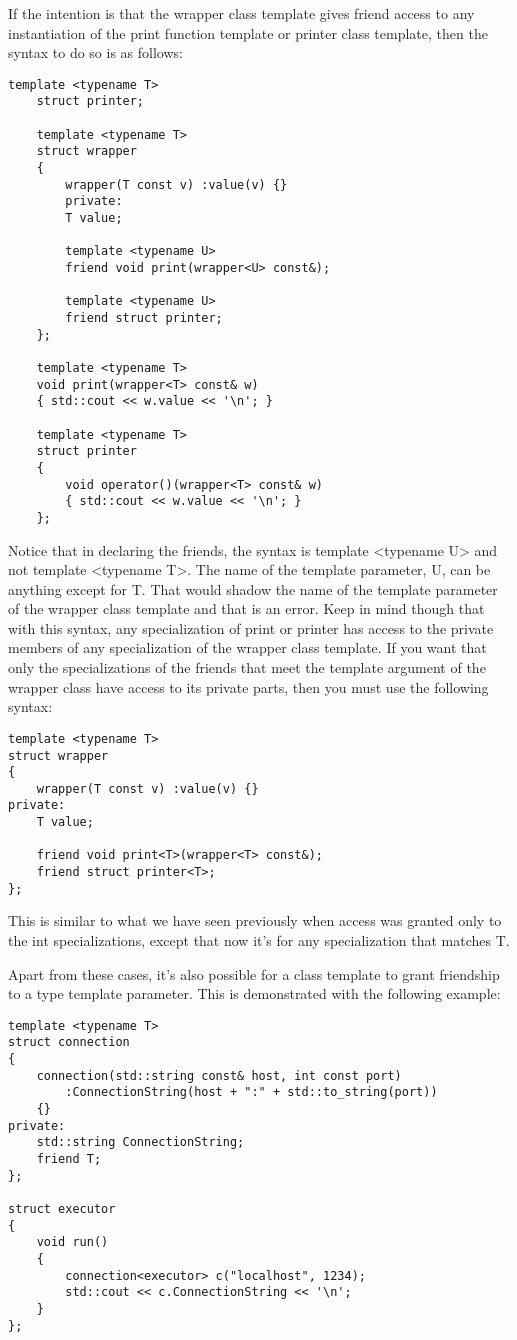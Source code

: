 If the intention is that the wrapper class template gives friend access to any instantiation of the print function template or printer class template, then the syntax to do so is as follows:

\begin{lstlisting}[style=styleCXX]
	template <typename T>
	struct printer;
	
	template <typename T>
	struct wrapper
	{
		wrapper(T const v) :value(v) {}
		private:
		T value;
		
		template <typename U>
		friend void print(wrapper<U> const&);
		
		template <typename U>
		friend struct printer;
	};
	
	template <typename T>
	void print(wrapper<T> const& w)
	{ std::cout << w.value << '\n'; }
	
	template <typename T>
	struct printer
	{
		void operator()(wrapper<T> const& w)
		{ std::cout << w.value << '\n'; }
	};
\end{lstlisting}

Notice that in declaring the friends, the syntax is template <typename U> and not template <typename T>. The name of the template parameter, U, can be anything except for T. That would shadow the name of the template parameter of the wrapper class template and that is an error. Keep in mind though that with this syntax, any specialization of print or printer has access to the private members of any specialization of the wrapper class template. If you want that only the specializations of the friends that meet the template argument of the wrapper class have access to its private parts, then you must use the following syntax:

\begin{lstlisting}[style=styleCXX]
template <typename T>
struct wrapper
{
	wrapper(T const v) :value(v) {}
private:
	T value;
	
	friend void print<T>(wrapper<T> const&);
	friend struct printer<T>;
};
\end{lstlisting}

This is similar to what we have seen previously when access was granted only to the int specializations, except that now it’s for any specialization that matches T.

Apart from these cases, it’s also possible for a class template to grant friendship to a type template parameter. This is demonstrated with the following example:

\begin{lstlisting}[style=styleCXX]
template <typename T>
struct connection
{
	connection(std::string const& host, int const port)
		:ConnectionString(host + ":" + std::to_string(port))
	{}
private:
	std::string ConnectionString;
	friend T;
};

struct executor
{
	void run()
	{
		connection<executor> c("localhost", 1234);
		std::cout << c.ConnectionString << '\n';
	}
};
\end{lstlisting}

